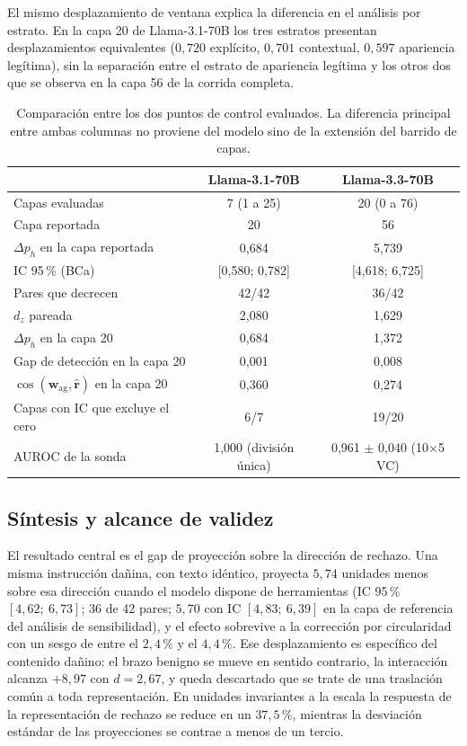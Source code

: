 \documentclass[12pt,a4paper]{article}
\begin{document}
El mismo desplazamiento de ventana explica la diferencia en el análisis por estrato. En la capa 20 de Llama-3.1-70B los tres estratos presentan desplazamientos equivalentes ($0{,}720$ explícito, $0{,}701$ contextual, $0{,}597$ apariencia legítima), sin la separación entre el estrato de apariencia legítima y los otros dos que se observa en la capa 56 de la corrida completa.

\begin{table}[htbp]
\centering
\small
\begin{tabular}{@{}lcc@{}}
\toprule
 & Llama-3.1-70B & Llama-3.3-70B \\
\midrule
Capas evaluadas & 7 (1 a 25) & 20 (0 a 76) \\
Capa reportada & 20 & 56 \\
$\Delta p_{h}$ en la capa reportada & 0,684 & 5,739 \\
IC 95\,\% (BCa) & [0,580; 0,782] & [4,618; 6,725] \\
Pares que decrecen & 42/42 & 36/42 \\
$d_z$ pareada & 2,080 & 1,629 \\
$\Delta p_{h}$ en la capa 20 & 0,684 & 1,372 \\
Gap de detección en la capa 20 & 0,001 & 0,008 \\
$\cos(\bm{w}_{\text{ag}}, \hat{\bm{r}})$ en la capa 20 & 0,360 & 0,274 \\
Capas con IC que excluye el cero & 6/7 & 19/20 \\
AUROC de la sonda & 1,000 (división única) & 0,961 $\pm$ 0,040 (10$\times$5 VC) \\
\bottomrule
\end{tabular}
\caption{Comparación entre los dos puntos de control evaluados. La diferencia principal entre ambas columnas no proviene del modelo sino de la extensión del barrido de capas.}
\label{tab:comparacion}
\end{table}

\subsection{Síntesis y alcance de validez}

\justifying

El resultado central es el gap de proyección sobre la dirección de rechazo. Una misma instrucción dañina, con texto idéntico, proyecta $5{,}74$ unidades menos sobre esa dirección cuando el modelo dispone de herramientas (IC 95\,\% $[4{,}62;\ 6{,}73]$; 36 de 42 pares; $5{,}70$ con IC $[4{,}83;\ 6{,}39]$ en la capa de referencia del análisis de sensibilidad), y el efecto sobrevive a la corrección por circularidad con un sesgo de entre el $2{,}4\,\%$ y el $4{,}4\,\%$. Ese desplazamiento es específico del contenido dañino: el brazo benigno se mueve en sentido contrario, la interacción alcanza $+8{,}97$ con $d = 2{,}67$, y queda descartado que se trate de una traslación común a toda representación. En unidades invariantes a la escala la respuesta de la representación de rechazo se reduce en un $37{,}5\,\%$, mientras la desviación estándar de las proyecciones se contrae a menos de un tercio.
\end{document}
